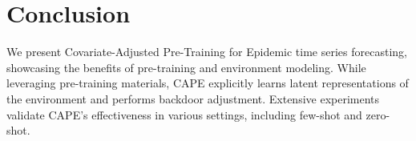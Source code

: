 
\section{Conclusion}
We present Covariate-Adjusted Pre-Training for Epidemic time series forecasting, showcasing the benefits of pre-training and environment modeling. While leveraging pre-training materials, CAPE explicitly learns latent representations of the environment and performs backdoor adjustment. Extensive experiments validate CAPE's effectiveness in various settings, including few-shot and zero-shot.


